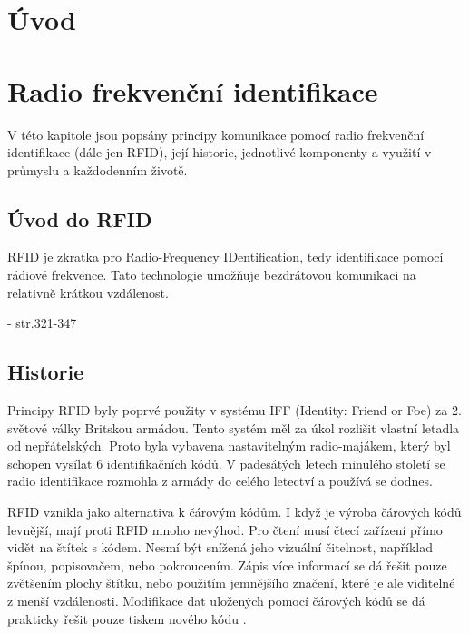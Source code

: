 
\chapter{Úvod}
\label{uvod}

\chapter{Radio frekvenční identifikace}
\label{technologie_rfid}
V této kapitole jsou popsány principy komunikace pomocí radio frekvenční identifikace (dále jen RFID), její historie, jednotlivé komponenty a využití v průmyslu a každodenním životě.

\section{Úvod do RFID}
RFID je zkratka pro {Radio-Frequency IDentification}, tedy identifikace pomocí rádiové frekvence. Tato technologie umožňuje bezdrátovou komunikaci na relativně krátkou vzdálenost\cite{The_RF_in_RFID}.
\par
{}\cite{Smart_Cards_Tokens_Security}{ - str.321-347}

\section{Historie}
Principy RFID byly poprvé použity v systému IFF (Identity: Friend or Foe) za 2. světové války Britskou armádou. Tento systém měl za úkol rozlišit vlastní letadla od nepřátelských. Proto byla vybavena nastavitelným {radio-majákem}, který byl schopen vysílat 6 identifikačních kódů. V padesátých letech minulého století se radio identifikace rozmohla z armády do celého letectví a používá se dodnes. %
\par
RFID vznikla jako alternativa k čárovým kódům. I když je výroba čárových kódů levnější, mají proti RFID mnoho nevýhod. Pro čtení musí čtecí zařízení přímo vidět na štítek s kódem. Nesmí být snížená jeho vizuální čitelnost, například špínou, popisovačem, nebo pokroucením. Zápis více informací se dá řešit pouze zvětšením plochy štítku, nebo použitím jemnějšího značení, které je ale viditelné z menší vzdálenosti. Modifikace dat uložených pomocí čárových kódů se dá prakticky řešit pouze tiskem nového kódu \cite{The_RF_in_RFID}\cite{Emulator_UHD_RFID_Tagu}.

